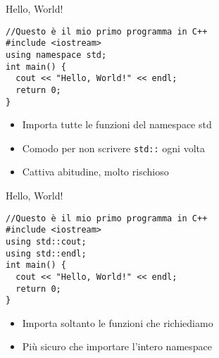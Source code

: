 \begin{frame}[fragile]{Hello, World!}
  \vfill
  \begin{lstlisting}
//Questo è il mio primo programma in C++
#include <iostream>
using namespace std;
int main() {
  cout << "Hello, World!" << endl;
  return 0;
}
  \end{lstlisting}
  \vfill
  \begin{itemize}
    \item Importa \alert{tutte} le funzioni del namespace std
    \vfill
    \item Comodo per non scrivere \lstinline$std::$ ogni volta
    \vfill
    \item Cattiva abitudine, molto rischioso
  \end{itemize}
  \vfill
\end{frame}

\begin{frame}[fragile]{Hello, World!}
  \vfill
  \begin{lstlisting}
//Questo è il mio primo programma in C++
#include <iostream>
using std::cout;
using std::endl;
int main() {
  cout << "Hello, World!" << endl;
  return 0;
}
  \end{lstlisting}
  \vfill
  \begin{itemize}
    \item Importa soltanto le funzioni che richiediamo
    \vfill
    \item Più sicuro che importare l'intero namespace
  \end{itemize}
  \vfill
\end{frame}

